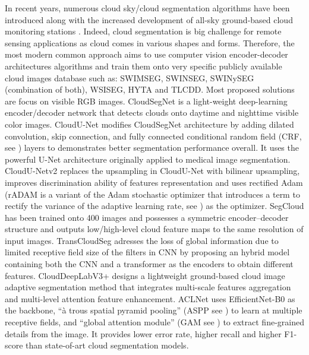 \documentclass{article}
\begin{document}
In recent years, numerous cloud sky/cloud segmentation algorithms have been introduced along with the increased development of all-sky ground-based cloud monitoring stations \citep{RetrievingCloudCharacteristicsfromGroundBasedDaytimeColorAllSkyImages, rs12111902, ASC2, amt-15-3629-2022}.
Indeed, cloud segmentation is big challenge for remote sensing applications as cloud comes in various shapes and forms. Therefore, the most modern common approach aims to use computer vision encoder-decoder architectures algorithms and train them onto very specific publicly available cloud images database such as: SWIMSEG, SWINSEG, SWINySEG (combination of both), WSISEG, HYTA and TLCDD. Most proposed solutions are focus on visible RGB images.
CloudSegNet \citep{dev2019cloudsegnet} is a light-weight deep-learning encoder/decoder network that detects clouds onto daytime and nighttime visible color images.
CloudU-Net \citep{CloudUNet} modifies CloudSegNet architecture by adding dilated convolution, skip connection, and fully connected conditional random field (CRF, see \citealt{McCallumCRF}) layers to demonstrates better segmentation performance overall. It uses the powerful U-Net architecture \citep{UNET} originally applied to medical image segmentation.
CloudU-Netv2 \citep{CloudUNetv2} replaces the upsampling in CloudU-Net with bilinear upsampling, improves discrimination ability of features representation and uses rectified Adam (rADAM is a variant of the Adam \cite{ADAM} stochastic optimizer that introduces a term to rectify the variance of the adaptive learning rate, see \citet{RADAM}) as the optimizer.
SegCloud \citep{SegCloud} has been trained onto 400 images and possesses a symmetric encoder–decoder structure and outputs low/high-level cloud feature maps to the same resolution of input images.
TransCloudSeg \citep{TransCloudSeg} adresses the loss of global information due to limited receptive field size of the filters in CNN by proposing an hybrid model containing both the CNN and a transformer \citep{TRANSFORMER} as the encoders to obtain different features.
CloudDeepLabV3+ \citep{CloudDeepLabV3} designs a lightweight ground-based cloud image adaptive segmentation method  that integrates multi-scale fea­tures aggregation and multi-level attention feature enhancement.
ACLNet \citep{makwana2022aclnet} uses EfficientNet-B0 as the backbone, “à trous spatial pyramid pooling” (ASPP see \citet{ATROUS}) to learn at multiple receptive fields, and “global attention module” (GAM see \citet{GAM}) to extract fine-grained details from the image. It provides lower error rate, higher recall and higher F1-score than state-of-art cloud segmentation models.
\end{document}
